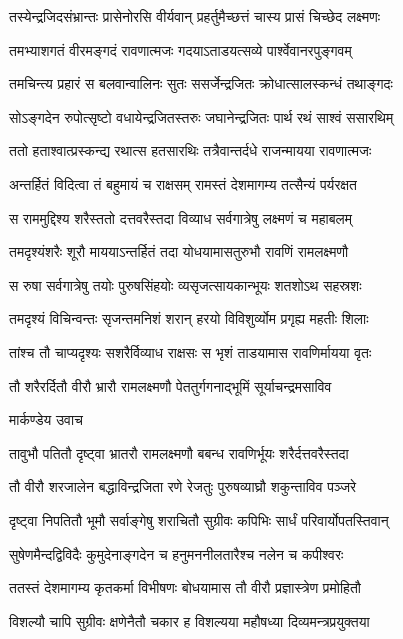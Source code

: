 \twolineshloka
{तस्येन्द्रजिदसंभ्रान्तः प्रासेनोरसि वीर्यवान्}
{प्रहर्तुमैच्छत्तं चास्य प्रासं चिच्छेद लक्ष्मणः}


\twolineshloka
{तमभ्याशगतं वीरमङ्गदं रावणात्मजः}
{गदयाऽताडयत्सव्ये पार्श्वेवानरपुङ्गवम्}


\twolineshloka
{तमचिन्त्य प्रहारं स बलवान्वालिनः सुतः}
{ससर्जेन्द्रजितः क्रोधात्सालस्कन्धं तथाङ्गदः}


\twolineshloka
{सोऽङ्गदेन रुपोत्सृष्टो वधायेन्द्रजितस्तरुः}
{जघानेन्द्रजितः पार्थ रथं साश्वं ससारथिम्}


\twolineshloka
{ततो हताश्वात्प्रस्कन्द्य रथात्स हतसारथिः}
{तत्रैवान्तर्दधे राजन्मायया रावणात्मजः}


\twolineshloka
{अन्तर्हितं विदित्वा तं बहुमायं च राक्षसम्}
{रामस्तं देशमागम्य तत्सैन्यं पर्यरक्षत}


\twolineshloka
{स राममुद्दिश्य शरैस्ततो दत्तवरैस्तदा}
{विव्याध सर्वगात्रेषु लक्ष्मणं च महाबलम्}


\twolineshloka
{तमदृश्यंशरैः शूरौ माययाऽन्तर्हितं तदा}
{योधयामासतुरुभौ रावणिं रामलक्ष्मणौ}


\twolineshloka
{स रुषा सर्वगात्रेषु तयोः पुरुषसिंहयोः}
{व्यसृजत्सायकान्भूयः शतशोऽथ सहस्रशः}


\twolineshloka
{तमदृश्यं विचिन्वन्तः सृजन्तमनिशं शरान्}
{हरयो विविशुर्व्योम प्रगृह्य महतीः शिलाः}


\twolineshloka
{तांश्च तौ चाप्यदृश्यः सशरैर्विव्याध राक्षसः}
{स भृशं ताडयामास रावणिर्मायया वृतः}


\twolineshloka
{तौ शरैरर्दितौ वीरौ भ्रारौ रामलक्ष्मणौ}
{पेततुर्गगनाद्भूमिं सूर्याचन्द्रमसाविव}


\twolineshloka
{मार्कण्डेय उवाच}
{}


\twolineshloka
{तावुभौ पतितौ दृष्ट्वा भ्रातरौ रामलक्ष्मणौ}
{बबन्ध रावणिर्भूयः शरैर्दत्तवरैस्तदा}


\twolineshloka
{तौ वीरौ शरजालेन बद्धाविन्द्रजिता रणे}
{रेजतुः पुरुषव्याघ्रौ शकुन्ताविव पञ्जरे}


\twolineshloka
{दृष्ट्वा निपतितौ भूमौ सर्वाङ्गेषु शराचितौ}
{सुग्रीवः कपिभिः सार्धं परिवार्योपतस्तिवान्}


\twolineshloka
{सुषेणमैन्दद्विविदैः कुमुदेनाङ्गदेन च}
{हनुमननीलतारैश्च नलेन च कपीश्वरः}


\twolineshloka
{ततस्तं देशमागम्य कृतकर्मा विभीषणः}
{बोधयामास तौ वीरौ प्रज्ञास्त्रेण प्रमोहितौ}


\twolineshloka
{विशल्यौ चापि सुग्रीवः क्षणेनैतौ चकार ह}
{विशल्यया महौषध्या दिव्यमन्त्रप्रयुक्तया}


